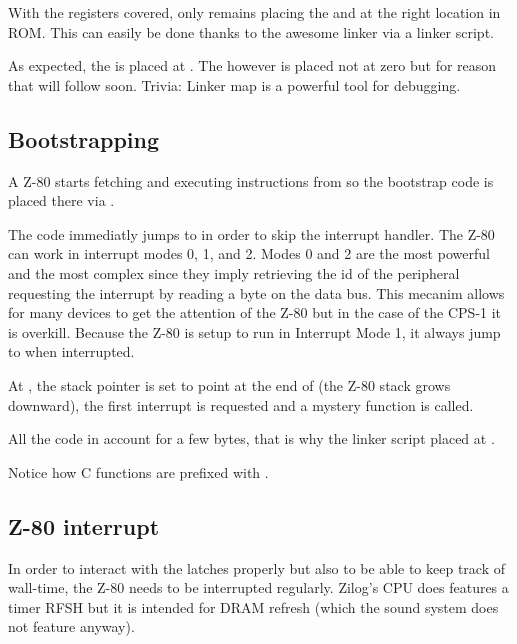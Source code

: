 

With the registers covered, only remains placing the  and  at the right location in ROM. This can easily be done thanks to the awesome  linker via a linker script.



As expected, the  is placed at . The  however is placed not at zero but  for reason that will follow soon.
Trivia: Linker map is a powerful tool for debugging.

\subsection{Bootstrapping}
A Z-80 starts fetching and executing instructions from  so the bootstrap code  is placed there via .

The code immediatly jumps to  in order to skip the interrupt handler. The Z-80 can work in interrupt modes 0, 1, and 2. Modes 0 and 2 are the most powerful and the most complex since they imply retrieving the id of the peripheral requesting the interrupt by reading a byte on the data bus. This mecanim allows for many devices to get the attention of the Z-80 but in the case of the CPS-1 it is overkill. Because the Z-80 is setup to run in Interrupt Mode 1, it always jump to  when interrupted.

At , the stack pointer  is set to point at the end of  (the Z-80 stack grows downward), the first interrupt is requested and a mystery  function is called.

All the code in  account for a few bytes, that is why the linker script placed  at .

Notice how C functions are prefixed with \icode{\_}.










\subsection{Z-80 interrupt}
In order to interact with the latches properly but also to be able to keep track of wall-time, the Z-80 needs to be interrupted regularly. Zilog's CPU does features a timer RFSH but it is intended for DRAM refresh (which the sound system does not feature anyway).

